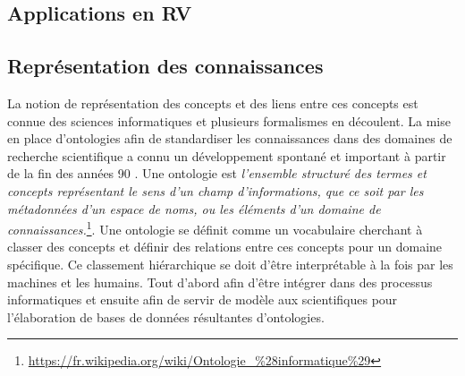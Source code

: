 \subsection{Applications en RV}



\subsection{Représentation des connaissances}

La notion de représentation des concepts et des liens entre ces concepts est connue des sciences informatiques et plusieurs formalismes en découlent. La mise en place d'ontologies afin de standardiser les connaissances dans des domaines de recherche scientifique a connu un développement spontané et important à partir de la fin des années 90 \cite{schulze-kremer_ontologies_2002, baker_ontology_1999}. 
Une ontologie est \textit{l'ensemble structuré des termes et concepts représentant le sens d'un champ d'informations, que ce soit par les métadonnées d'un espace de noms, ou les éléments d'un domaine de connaissances.}\footnote{\url{https://fr.wikipedia.org/wiki/Ontologie_\%28informatique\%29}}. Une ontologie se définit comme un vocabulaire cherchant à classer des concepts et définir des relations entre ces concepts pour un domaine spécifique. Ce classement hiérarchique se doit d'être interprétable à la fois par les machines et les humains. Tout d'abord afin d'être intégrer dans des processus informatiques et ensuite afin de servir de modèle aux scientifiques pour l'élaboration de bases de données résultantes d'ontologies.

